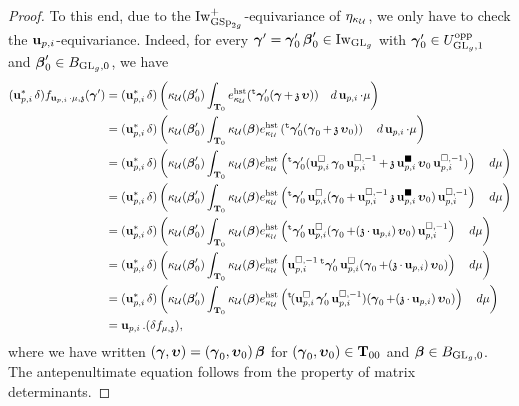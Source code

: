 \begin{proof}
To this end, due to the $\Iw_{\GSp_{2g}}^+$-equivariance of $\eta_{\kappa_{\calU}}$, we only have to check the $\bfu_{p,i}$-equivariance. Indeed, for every $\bfgamma'=\bfgamma_0'\bfbeta_0'\in \Iw_{\GL_g}$ with $\bfgamma'_0\in U^{\opp}_{\GL_g,1}$ and $\bfbeta'_0\in B_{\GL_g,0}$, we have  
\begin{align*}
    (\bfu_{p,i}^*\delta) f_{\bfu_{p,i}\cdot\mu, \frakz}(\bfgamma') & = (\bfu_{p,i}^*\delta)\left(\kappa_{\calU}(\bfbeta_0')\int_{\T_0}e_{\kappa_{\calU}}^{\hst}(\trans\bfgamma'_0(\bfgamma+\frakz\bfupsilon))\quad d\bfu_{p,i}\cdot\mu\right) \\
    & = (\bfu_{p,i}^*\delta)\left(\kappa_{\calU}(\bfbeta_0')\int_{\T_0} \kappa_{\calU}(\bfbeta)e_{\kappa_{\calU}}^{\hst}\left(\trans\bfgamma_0'(\bfgamma_0+\frakz\bfupsilon_0)\right)\quad d\bfu_{p,i}\cdot\mu\right)  \\
    & = (\bfu_{p,i}^*\delta) \left(\kappa_{\calU}(\bfbeta_0')\int_{\T_0}\kappa_{\calU}(\bfbeta)e_{\kappa_{\calU}}^{\hst}\left(\trans\bfgamma_0'(\bfu_{p,i}^{\square}\bfgamma_0\bfu_{p,i}^{\square,-1}+\frakz\bfu_{p,i}^{\blacksquare}\bfupsilon_0\bfu_{p,i}^{\square, -1})\right)\quad d\mu\right) \\
    & = (\bfu_{p,i}^*\delta)\left(\kappa_{\calU}(\bfbeta_0')\int_{\T_0}\kappa_{\calU}(\bfbeta)e_{\kappa_{\calU}}^{\hst}\left(\trans\bfgamma_0'\bfu_{p,i}^{\square}(\bfgamma_0+\bfu_{p,i}^{\square, -1}\frakz\bfu_{p,i}^{\blacksquare}\bfupsilon_0)\bfu_{p,i}^{\square, -1}\right)\quad d\mu\right) \\
    & = (\bfu_{p,i}^*\delta)\left(\kappa_{\calU}(\bfbeta_0')\int_{\T_0}\kappa_{\calU}(\bfbeta) e_{\kappa_{\calU}}^{\hst}\left(\trans\bfgamma_0'\bfu_{p,i}^{\square}(\bfgamma_0+(\frakz\cdot\bfu_{p,i})\bfupsilon_0)\bfu_{p,i}^{\square, -1}\right)\quad d\mu\right) \\
    & = (\bfu_{p,i}^*\delta)\left(\kappa_{\calU}(\bfbeta_0')\int_{\T_0} \kappa_{\calU}(\bfbeta) e_{\kappa_{\calU}}^{\hst}\left(\bfu_{p,i}^{\square, -1}\trans\bfgamma'_0\bfu_{p, i}^{\square}(\bfgamma_0+(\frakz\cdot\bfu_{p,i})\bfupsilon_0)\right)\quad d\mu \right) \\
    & = (\bfu_{p,i}^*\delta)\left(\kappa_{\calU}(\bfbeta_0')\int_{\T_0}\kappa_{\calU}(\bfbeta) e_{\kappa_{\calU}}^{\hst}\left(\trans(\bfu_{p,i}^{\square}\bfgamma_0'\bfu_{p,i}^{\square, -1})(\bfgamma_0+(\frakz\cdot\bfu_{p,i})\bfupsilon_0)\right)\quad d\mu\right) \\
    & = \bfu_{p,i} . (\delta f_{\mu, \frakz}), 
\end{align*} 
where we have written $(\bfgamma, \bfupsilon)=(\bfgamma_0, \bfupsilon_0)\bfbeta$ for $(\bfgamma_0, \bfupsilon_0)\in \T_{00}$ and $\bfbeta\in B_{\GL_g,0}$.
The antepenultimate equation follows from the property of matrix determinants. 
\end{proof}

